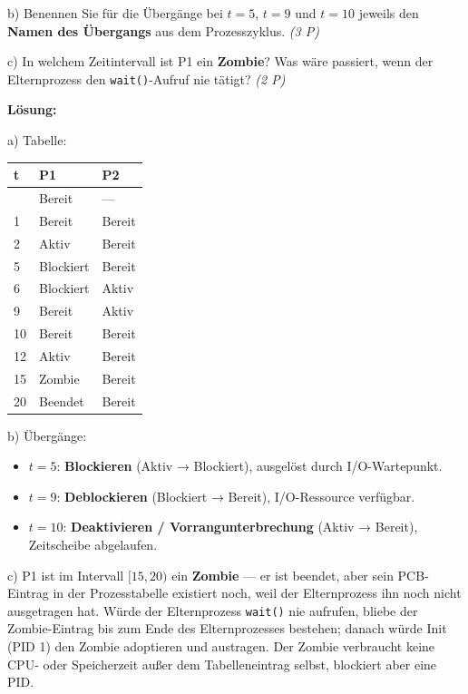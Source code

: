 \documentclass[11pt, a4paper]{article}
\begin{document}
b) Benennen Sie für die Übergänge bei $t=5$, $t=9$ und $t=10$ jeweils den \textbf{Namen des Übergangs} aus dem Prozesszyklus. \textit{(3 P)}


c) In welchem Zeitintervall ist P1 ein \textbf{Zombie}? Was wäre passiert, wenn der Elternprozess den \texttt{wait()}-Aufruf nie tätigt? \textit{(2 P)}


\textbf{Lösung:}


a) Tabelle:



{\small
\begin{tabularx}{\linewidth}{XXX}
\hline
\rowcolor{tableheadbg}
{\color{white}\textbf{t}} & {\color{white}\textbf{P1}} & {\color{white}\textbf{P2}} \\[2pt]
\hline
\endhead
\hline
\endfoot
0 & Bereit & — \\
1 & Bereit & Bereit \\
2 & Aktiv & Bereit \\
5 & Blockiert & Bereit \\
6 & Blockiert & Aktiv \\
9 & Bereit & Aktiv \\
10 & Bereit & Bereit \\
12 & Aktiv & Bereit \\
15 & Zombie & Bereit \\
20 & Beendet & Bereit \\
\end{tabularx}
}


b) Übergänge:

\begin{itemize}
  \item $t=5$: \textbf{Blockieren} (Aktiv → Blockiert), ausgelöst durch I/O-Wartepunkt.
  \item $t=9$: \textbf{Deblockieren} (Blockiert → Bereit), I/O-Ressource verfügbar.
  \item $t=10$: \textbf{Deaktivieren / Vorrangunterbrechung} (Aktiv → Bereit), Zeitscheibe abgelaufen.
\end{itemize}

c) P1 ist im Intervall $[15, 20)$ ein \textbf{Zombie} — er ist beendet, aber sein PCB-Eintrag in der Prozesstabelle existiert noch, weil der Elternprozess ihn noch nicht ausgetragen hat. Würde der Elternprozess \texttt{wait()} nie aufrufen, bliebe der Zombie-Eintrag bis zum Ende des Elternprozesses bestehen; danach würde Init (PID 1) den Zombie adoptieren und austragen. Der Zombie verbraucht keine CPU- oder Speicherzeit außer dem Tabelleneintrag selbst, blockiert aber eine PID.
\end{document}
